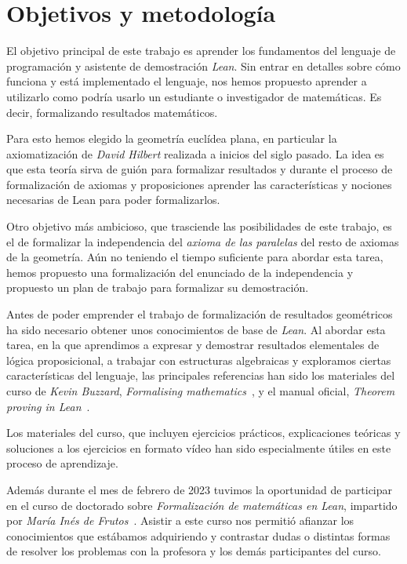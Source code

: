 \section{Objetivos y metodología}

El objetivo principal de este trabajo es aprender los fundamentos del lenguaje
de programación y asistente de demostración \textit{Lean}. Sin entrar en
detalles sobre cómo funciona y está implementado el lenguaje, nos hemos
propuesto aprender a utilizarlo como podría usarlo un estudiante o investigador de
matemáticas. Es decir, formalizando resultados matemáticos.

Para esto hemos elegido la geometría euclídea plana, en particular la
axiomatización de \textit{David Hilbert} realizada a inicios del siglo pasado.
La idea es que esta teoría sirva de guión para formalizar resultados y durante
el proceso de formalización de axiomas y proposiciones aprender las
características y nociones necesarias de Lean para poder formalizarlos.

Otro objetivo más ambicioso, que trasciende las posibilidades de este trabajo,
es el de formalizar la independencia del \textit{axioma de las paralelas} del
resto de axiomas de la geometría. Aún no teniendo el tiempo suficiente para
abordar esta tarea, hemos propuesto una formalización del enunciado de la
independencia y propuesto un plan de trabajo para formalizar su demostración.

Antes de poder emprender el trabajo de formalización de resultados geométricos
ha sido necesario obtener unos conocimientos de base de \textit{Lean}. Al
abordar esta tarea, en la que aprendimos a expresar y demostrar resultados
elementales de lógica proposicional, a trabajar con estructuras algebraicas y
exploramos ciertas características del lenguaje, las principales referencias han
sido los materiales del curso de \textit{Kevin Buzzard}, \textit{Formalising
	mathematics}~\cite{buzzardFormalisingMathematicsFormalising}, y el manual
oficial, \textit{Theorem proving in Lean}~\cite{avigadLeanTheoremProver}.

Los materiales del curso, que incluyen ejercicios prácticos, explicaciones
teóricas y soluciones a los ejercicios en formato vídeo han sido especialmente
útiles en este proceso de aprendizaje.

Además durante el mes de febrero de 2023 tuvimos la oportunidad de participar en
el curso de doctorado sobre \textit{Formalización de matemáticas en Lean},
impartido por \textit{María Inés de
	Frutos}~\cite{defrutosFormalizacionMatematicasLean}. Asistir a este curso nos
permitió afianzar los conocimientos que estábamos adquiriendo y contrastar dudas
o distintas formas de resolver los problemas con la profesora y los demás
participantes del curso.

